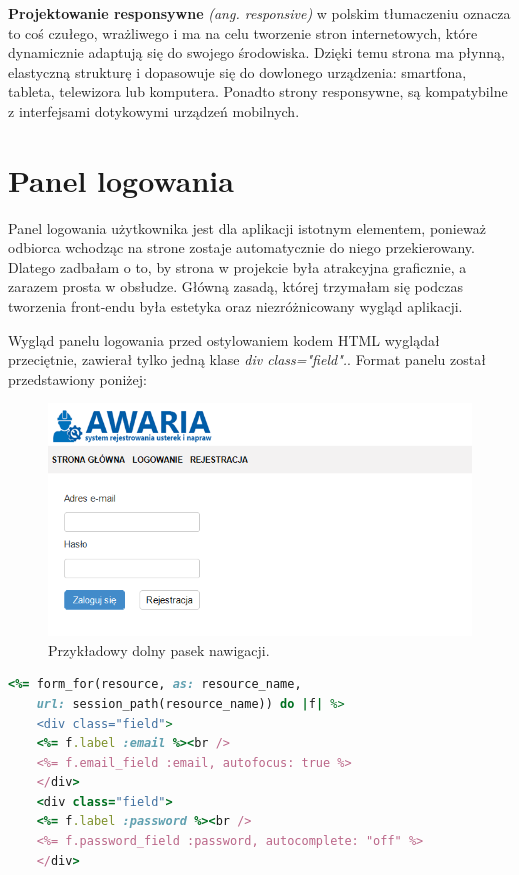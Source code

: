 \documentclass[openright]{xmgr}
\begin{document}
	\textbf{Projektowanie responsywne} \textit{(ang. responsive)} w polskim tłumaczeniu oznacza to coś czułego, wrażliwego i ma na celu tworzenie stron internetowych, które dynamicznie adaptują się do swojego środowiska. Dzięki temu strona ma płynną, elastyczną strukturę i dopasowuje się do dowlonego urządzenia: smartfona, tableta, telewizora lub komputera. Ponadto strony responsywne, są kompatybilne z interfejsami dotykowymi urządzeń mobilnych. 
	\newpage
	\section{Panel logowania}
	
	Panel logowania użytkownika jest dla aplikacji istotnym elementem, ponieważ odbiorca wchodząc na strone zostaje automatycznie do niego przekierowany. Dlatego zadbałam o to, by strona w projekcie była atrakcyjna graficznie, a zarazem prosta w obsłudze. Główną zasadą, której trzymałam się podczas tworzenia front-endu była estetyka oraz niezróżnicowany wygląd aplikacji.  
	
	Wygląd panelu logowania przed ostylowaniem kodem HTML wyglądał przeciętnie, zawierał tylko jedną klase \textit{div class="field".}. Format panelu został przedstawiony poniżej:
	
	\begin{figure}[!tbh]
		\centering
		\includegraphics[width=\linewidth]{image/panel}
		\caption{Przykładowy dolny pasek nawigacji.}
	\end{figure}
	
	\newpage
	\begin{lstlisting}[language=Ruby,lineskip={-1pt},caption=Cześć kodu Ruby nieostylowanego kodem HTML]
	<%= form_for(resource, as: resource_name,
	url: session_path(resource_name)) do |f| %>
	<div class="field">
	<%= f.label :email %><br />
	<%= f.email_field :email, autofocus: true %>
	</div>
	<div class="field">
	<%= f.label :password %><br />
	<%= f.password_field :password, autocomplete: "off" %>
	</div>
	\end{lstlisting} 
	
\end{document}
